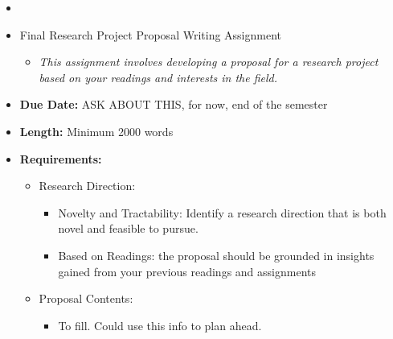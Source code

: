 \documentclass[
]{article}
\begin{document}
\begin{itemize}
\begin{itemize}
\begin{itemize}
      \begin{itemize}
      \item
        Key Findings: Summarize the main results and conclusions of the
        paper.
      \item
        Techniques Used: Describe the methodologies and approaches
        employed in the research.
      \item
        Future Work Directions: Identify and discuss potential avenues
        for future research suggested by the paper.
      \end{itemize}
    \end{itemize}
  \end{itemize}
\item
\item
  Final Research Project Proposal Writing Assignment

  \begin{itemize}
  \item
    \emph{This assignment involves developing a proposal for a research
    project based on your readings and interests in the field.}
  \end{itemize}
\end{itemize}

\begin{itemize}
\item
  \textbf{Due Date:} ASK ABOUT THIS, for now, end of the semester
\item
  \textbf{Length:} Minimum 2000 words
\item
  \textbf{Requirements:}

  \begin{itemize}
  \item
    Research Direction:

    \begin{itemize}
    \item
      Novelty and Tractability: Identify a research direction that is
      both novel and feasible to pursue.
    \item
      Based on Readings: the proposal should be grounded in insights
      gained from your previous readings and assignments
    \end{itemize}
  \item
    Proposal Contents:

    \begin{itemize}
    \item
      To fill. Could use this info to plan ahead.
    \end{itemize}
  \end{itemize}
\end{itemize}
\end{document}
